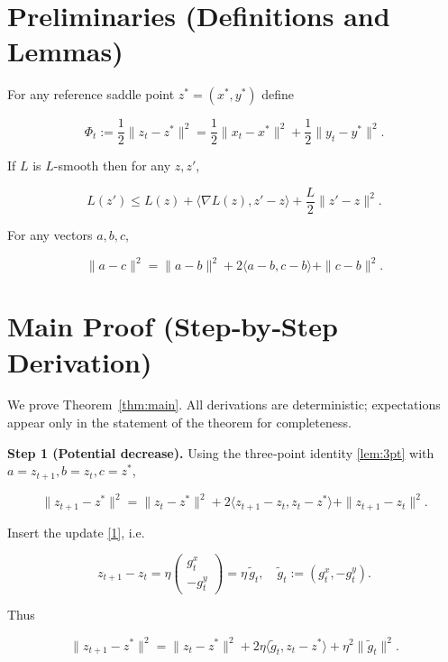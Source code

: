 \newpage
\section*{Preliminaries (Definitions and Lemmas)}
\begin{definition}
For any reference saddle point \(z^{*}=(x^{*},y^{*})\) define  

\[
\Phi_{t}:=\frac12\|z_{t}-z^{*}\|^{2}
      =\frac12\|x_{t}-x^{*}\|^{2}
      +\frac12\|y_{t}-y^{*}\|^{2}.
\tag{9}
\]
\end{definition}

\begin{lemma}\label{lem:smooth}
If \(L\) is \(L\)-smooth then for any \(z,z'\),

\[
L(z')\le L(z)+\langle\nabla L(z),z'-z\rangle+\frac{L}{2}\|z'-z\|^{2}.
\tag{10}
\]
\end{lemma}

\begin{lemma}\label{lem:3pt}
For any vectors \(a,b,c\),

\[
\|a-c\|^{2}=\|a-b\|^{2}+2\langle a-b,c-b\rangle+\|c-b\|^{2}.
\tag{11}
\]
\end{lemma}

\section*{Main Proof (Step‑by‑Step Derivation)}
We prove Theorem~\ref{thm:main}.  
All derivations are deterministic; expectations appear only in the statement of the theorem for completeness.

\medskip
\noindent\textbf{Step 1 (Potential decrease).}  
Using the three‑point identity \eqref{lem:3pt} with \(a=z_{t+1}, b=z_{t}, c=z^{*}\),

\[
\|z_{t+1}-z^{*}\|^{2}
= \|z_{t}-z^{*}\|^{2}
+2\langle z_{t+1}-z_{t},z_{t}-z^{*}\rangle
+\|z_{t+1}-z_{t}\|^{2}.
\tag{12}
\]

Insert the update \eqref{1}, i.e.  

\[
z_{t+1}-z_{t}= \eta\begin{pmatrix} g^{x}_{t}\\ -g^{y}_{t}\end{pmatrix}
= \eta\,\tilde g_{t},
\quad\tilde g_{t}:=(g^{x}_{t},-g^{y}_{t}).
\tag{13}
\]

Thus  

\[
\|z_{t+1}-z^{*}\|^{2}
= \|z_{t}-z^{*}\|^{2}
+2\eta\langle\tilde g_{t},z_{t}-z^{*}\rangle
+\eta^{2}\|\tilde g_{t}\|^{2}.
\tag{14}
\]

